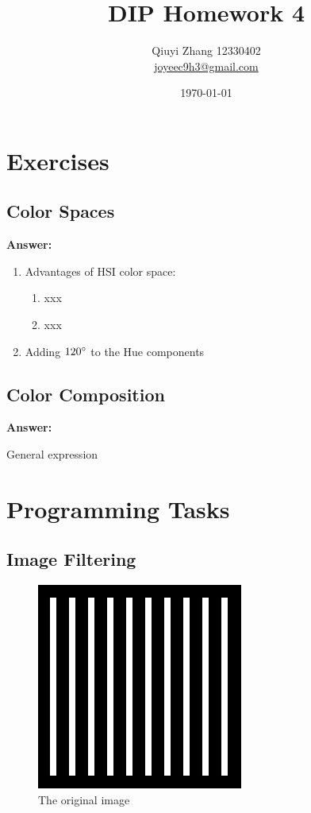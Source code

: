 \documentclass{article}
\begin{document}
\title{DIP Homework 4}
\author{Qiuyi Zhang 12330402 \\ \href{mailto:joyeec9h3@gmail.com}{joyeec9h3@gmail.com}} 
\date{\today}
\maketitle
\tableofcontents
\section{Exercises}

\subsection{Color Spaces}

\textbf{Answer:} 

\begin{enumerate}
\item Advantages of HSI color space:
\begin{enumerate}
\item xxx
\item xxx
\end{enumerate}

\item Adding $120\degree$ to the Hue components
\end{enumerate}

\subsection{Color Composition}

\textbf{Answer:}

General expression


\section{Programming Tasks}
\subsection{Image Filtering}

\begin{figure}[H]
	\centering
	\includegraphics[width=192pt]{../img/task_1.png}
	\caption{The original image}
\end{figure}
\end{document}
